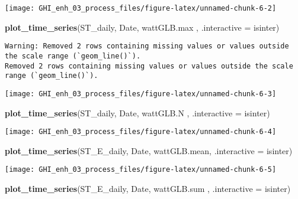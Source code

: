 \documentclass[
  10pt,
  a4paper,oneside]{article}
\newenvironment{Shaded}{\begin{snugshade}}{\end{snugshade}}
\newcommand{\AttributeTok}[1]{\textcolor[rgb]{0.13,0.29,0.53}{#1}}
\newcommand{\FunctionTok}[1]{\textcolor[rgb]{0.13,0.29,0.53}{\textbf{#1}}}
\newcommand{\NormalTok}[1]{#1}
\begin{document}
\begin{center}\texttt{[image: GHI\_enh\_03\_process\_files/figure-latex/unnamed-chunk-6-2]} \end{center}

\begin{Shaded}
\begin{Highlighting}[]
\FunctionTok{plot\_time\_series}\NormalTok{(ST\_daily, Date, wattGLB.max , }\AttributeTok{.interactive =}\NormalTok{ isinter)}
\end{Highlighting}
\end{Shaded}

\begin{verbatim}
Warning: Removed 2 rows containing missing values or values outside the scale range (`geom_line()`).
Removed 2 rows containing missing values or values outside the scale range (`geom_line()`).
\end{verbatim}

\begin{center}\texttt{[image: GHI\_enh\_03\_process\_files/figure-latex/unnamed-chunk-6-3]} \end{center}

\begin{Shaded}
\begin{Highlighting}[]
\FunctionTok{plot\_time\_series}\NormalTok{(ST\_daily, Date, wattGLB.N   , }\AttributeTok{.interactive =}\NormalTok{ isinter)}
\end{Highlighting}
\end{Shaded}

\begin{center}\texttt{[image: GHI\_enh\_03\_process\_files/figure-latex/unnamed-chunk-6-4]} \end{center}

\begin{Shaded}
\begin{Highlighting}[]
\FunctionTok{plot\_time\_series}\NormalTok{(ST\_E\_daily, Date, wattGLB.mean, }\AttributeTok{.interactive =}\NormalTok{ isinter)}
\end{Highlighting}
\end{Shaded}

\begin{center}\texttt{[image: GHI\_enh\_03\_process\_files/figure-latex/unnamed-chunk-6-5]} \end{center}

\begin{Shaded}
\begin{Highlighting}[]
\FunctionTok{plot\_time\_series}\NormalTok{(ST\_E\_daily, Date, wattGLB.sum , }\AttributeTok{.interactive =}\NormalTok{ isinter)}
\end{Highlighting}
\end{Shaded}
\end{document}
